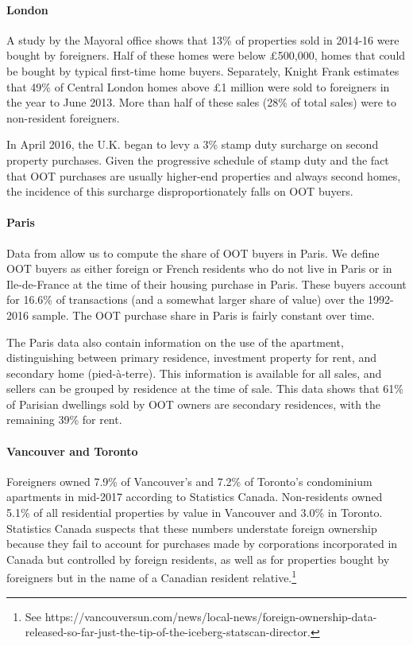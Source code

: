 \documentclass[letterpaper,12pt,dvipsnames,usenames]{article}
\theoremstyle{definition}
\begin{document}
\begin{spacing}{1.25}
\paragraph{London} A study by the Mayoral office shows that 13\% of properties sold in 2014-16 were bought by foreigners. Half of these homes were below \pounds 500,000, homes that could be bought by typical first-time home buyers. Separately, Knight Frank estimates that 49\% of Central London homes above \pounds1 million were sold to foreigners in the year to June 2013.
More than half of these sales (28\% of total sales) were to non-resident foreigners.

In April 2016, the U.K. began to levy a 3\%  stamp duty surcharge on second property purchases. Given the progressive schedule of stamp duty and the fact that OOT purchases are usually higher-end properties and always second homes, the incidence of this surcharge disproportionately falls on OOT buyers.


\paragraph{Paris} Data from \citet{CS:16} allow us to compute the share of OOT buyers in Paris. We define OOT buyers as either foreign or French residents who do not live in Paris or in Ile-de-France at the time of their housing purchase in Paris. These buyers account for 16.6\% of transactions (and a somewhat larger share of value) over the 1992-2016 sample. The OOT purchase share in Paris is fairly constant over time.

The Paris data also contain information on the use of the apartment, distinguishing between primary residence, investment property for rent, and secondary home (pied-\`a-terre). This information is available for all sales, and sellers can be grouped by residence at the time of sale. This data shows that 61\% of Parisian dwellings sold by OOT owners are secondary residences, with the remaining 39\% for rent.

\paragraph{Vancouver and Toronto} Foreigners owned 7.9\% of Vancouver's and 7.2\% of Toronto's condominium apartments   in mid-2017
according to Statistics Canada. Non-residents owned 5.1\% of all residential properties by value in Vancouver and 3.0\% in Toronto. Statistics Canada
suspects that these numbers understate foreign ownership because they fail to account for purchases made by corporations incorporated in Canada but controlled by foreign residents, as well as for properties bought by foreigners but in the name of a Canadian resident relative.\footnote{See https://vancouversun.com/news/local-news/foreign-ownership-data-released-so-far-just-the-tip-of-the-iceberg-statscan-director.}


\end{spacing}
\end{document}
